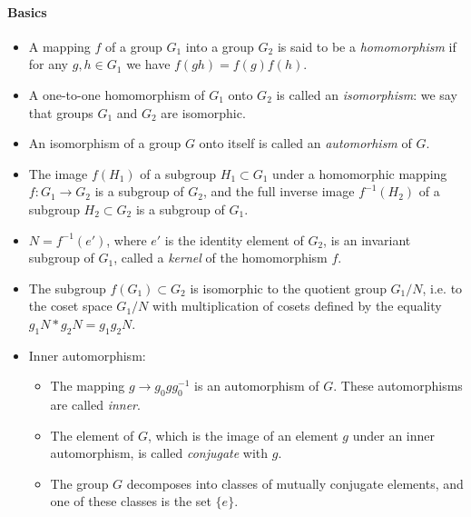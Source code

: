 \paragraph{Basics}
\begin{itemize}
	\item A mapping $f$ of a group $G_1$ into a group $G_2$ is said to be a \emph{homomorphism} if for any $g, h \in G_1$ we have $f(gh) = f(g)f(h)$.
	\item A one-to-one homomorphism of $G_1$ onto $G_2$ is called an \emph{isomorphism}: we say that groups $G_1$ and $G_2$ are isomorphic.
	\item An isomorphism of a group
	$G$ onto itself is called an \emph{automorhism} of $G$.
	\item The image $f(H_1)$ of a subgroup $H_1\subset G_1$ under a homomorphic mapping
	$f:G_1\rightarrow G_2$ is a subgroup of $G_2$, and the full inverse image $f^{-1}(H_2)$ of a subgroup $H_2 \subset G_2$ is a subgroup of $G_1$.
	\item $N=f^{-1}(e')$, where $e'$ is the identity element of $G_2$, is an invariant subgroup of $G_1$, called a \emph{kernel} of the homomorphism $f$.
	\item The subgroup $f(G_1)\subset G_2$
	is isomorphic to the quotient group $G_1/N$, i.e. to the
	coset space $G_1/N$ with multiplication of cosets defined by the equality $g_1N*g_2N = g_1g_2N$.
	\item Inner automorphism:
	\begin{itemize}
		\item The mapping $g\rightarrow g_0gg_0^{-1}$ is an automorphism of $G$. These automorphisms are called \emph{inner}.
		\item The element of $G$, which is the image of an element $g$ under an inner automorphism, is called \emph{conjugate} with $g$.
		\item The group $G$ decomposes into classes of mutually conjugate elements, and one of these classes is the set $\{e\}$.
	\end{itemize}
\end{itemize}
